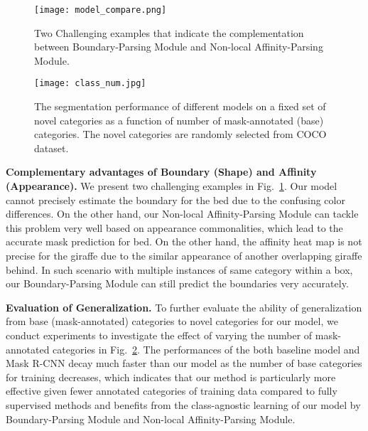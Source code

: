 \documentclass[runningheads]{llncs}
\begin{document}
\begin{figure}[!t]
\centering
\texttt{[image: model\_compare.png]}
\vspace{-0.1in}
\caption{Two Challenging examples that indicate the complementation between Boundary-Parsing Module and Non-local Affinity-Parsing Module.}
\label{fig:ablation_challenge}
\vspace{-0.1in}
\end{figure}

\begin{figure}[!t]
	\centering
\texttt{[image: class\_num.jpg]}
	\vspace{-0.2in}
	\caption{The segmentation performance of different models on a fixed set of novel categories as a function of number of mask-annotated (base) categories. The novel categories are randomly selected from COCO dataset.}
	\label{fig:class_num}
	\vspace{-0.2in}
\end{figure}

\smallskip\noindent\textbf{Complementary advantages of Boundary (Shape) and Affinity (Appearance).} We present two challenging examples in Fig.~\ref{fig:ablation_challenge}. Our model cannot precisely estimate the boundary for the bed due to the confusing color differences. On the other hand, our Non-local Affinity-Parsing Module can tackle this problem very well based on appearance commonalities, which lead to the accurate mask prediction for bed. On the other hand, the affinity heat map is not precise for the giraffe due to the similar appearance of another overlapping giraffe behind. In such scenario with multiple instances of same category within a box, our Boundary-Parsing Module can still predict the boundaries very accurately.     

\smallskip\noindent\textbf{Evaluation of Generalization.} To further evaluate the ability of generalization from base (mask-annotated) categories to novel categories for our model,  we conduct experiments to investigate the effect of varying the number of mask-annotated categories in Fig.~\ref{fig:class_num}. The performances of the both baseline model and Mask R-CNN decay much faster than our model as the number of base categories for training decreases, which indicates that our method is particularly more effective given fewer annotated categories of training data compared to fully supervised methods and benefits from the class-agnostic learning of our model by Boundary-Parsing Module and Non-local Affinity-Parsing Module.
\end{document}
